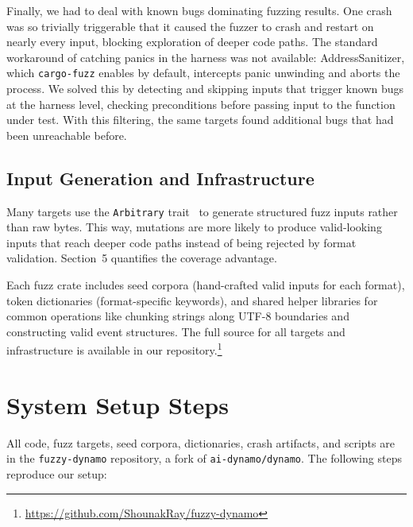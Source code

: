 \documentclass[11pt]{article}
\begin{document}
Finally, we had to deal with known bugs dominating fuzzing results. One crash was so trivially triggerable that it caused the fuzzer to crash and restart on nearly every input, blocking exploration of deeper code paths. The standard workaround of catching panics in the harness was not available: AddressSanitizer, which \texttt{cargo-fuzz} enables by default, intercepts panic unwinding and aborts the process. We solved this by detecting and skipping inputs that trigger known bugs at the harness level, checking preconditions before passing input to the function under test. With this filtering, the same targets found additional bugs that had been unreachable before.

\subsection{Input Generation and Infrastructure}

Many targets use the \texttt{Arbitrary} trait~\cite{arbitrary} to generate structured fuzz inputs rather than raw bytes. This way, mutations are more likely to produce valid-looking inputs that reach deeper code paths instead of being rejected by format validation. Section~5 quantifies the coverage advantage.

Each fuzz crate includes seed corpora (hand-crafted valid inputs for each format), token dictionaries (format-specific keywords), and shared helper libraries for common operations like chunking strings along UTF-8 boundaries and constructing valid event structures. The full source for all targets and infrastructure is available in our repository.\footnote{\url{https://github.com/ShounakRay/fuzzy-dynamo}}

\section{System Setup Steps}

All code, fuzz targets, seed corpora, dictionaries, crash artifacts, and scripts are in the \texttt{fuzzy-dynamo} repository, a fork of \texttt{ai-dynamo/dynamo}. The following steps reproduce our setup:
\end{document}
